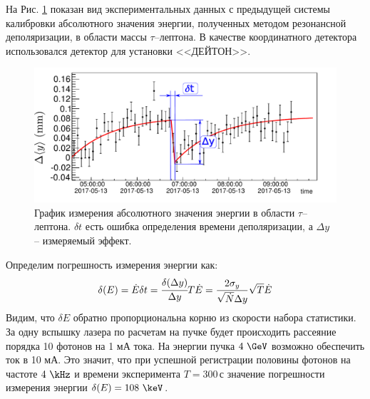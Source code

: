 На Рис. \ref{fig:RD_effect_graph} показан вид экспериментальных данных с предыдущей системы калибровки абсолютного значения энергии, полученных методом резонансной деполяризации, в области массы $\tau$--лептона. В качестве координатного детектора использовался детектор для установки <<ДЕЙТОН>>.
\begin{figure}[H]
	\begin{center}
		\includegraphics[width = 16cm]{img/rd_exp.pdf}
		\caption{График измерения абсолютного значения энергии в области $\tau$--лептона. $\delta t$ есть ошибка определения времени деполяризации, а $\Delta y$ -- измеряемый эффект.}
		\label{fig:RD_effect_graph}
	\end{center}
\end{figure}
\vspace{-20pt}
\noindent Определим погрешность измерения энергии как: 
\begin{equation}
\delta(E)= \dot{E} \delta t = \cfrac{\delta(\Delta y)}{\Delta y}T\dot{E} = \frac{2 \sigma_y}{\sqrt{\dot{N}} \Delta y}\sqrt{T}\dot{E}  
\end{equation}
Видим, что $\delta E$ обратно пропорциональна корню из скорости набора статистики. За одну вспышку лазера по расчетам на пучке будет происходить рассеяние порядка 10 фотонов на 1 мА тока. На энергии пучка $4~\GeV$ возможно обеспечить ток в 10 мА. Это значит, что при успешной регистрации половины фотонов на частоте $4~\kHz$ и времени эксперимента $ T = 300$\,с значение погрешности измерения энергии $\delta(E)= 108~\keV$.
 
